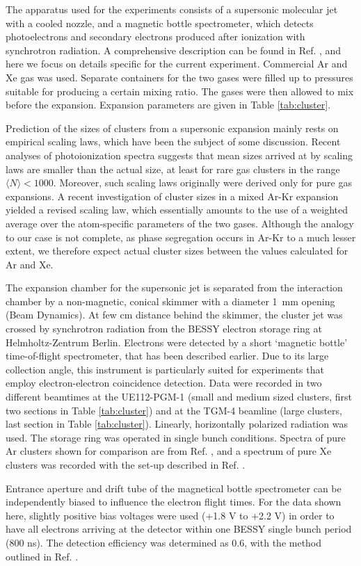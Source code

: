 %
%
The apparatus used for the experiments consists of a supersonic molecular jet with a cooled nozzle, and a magnetic bottle spectrometer, which detects photoelectrons and secondary electrons produced after ionization with synchrotron radiation.\cite{arion} 
A comprehensive description can be found in Ref. \cite{arion}, and here we focus on details specific for the current experiment. Commercial Ar and Xe gas was used. 
Separate containers for the two gases were filled up to pressures suitable for producing a certain mixing ratio. The gases were then allowed to mix before the expansion. 
Expansion parameters are given in Table \ref{tab:cluster}.

Prediction of the sizes of clusters from a supersonic expansion mainly rests on empirical scaling laws,\cite{hagena1981} which have been the subject of some discussion.
Recent analyses of photoionization spectra suggests that mean sizes arrived at by scaling laws are smaller than the actual size, at least for rare gas clusters in the range $\langle N\rangle < 1000$.\cite{bergersen,hergenhahnprb,foerstel_arg2_2011}
Moreover, such scaling laws originally were derived only for pure gas expansions.
A recent investigation of cluster sizes in a mixed Ar-Kr expansion yielded a revised scaling law, which essentially amounts to the use of a weighted average over the atom-specific parameters of the two gases.\cite{danylchenko2015} 
Although the analogy to our case is not complete, as phase segregation occurs in Ar-Kr to a much lesser extent,\cite{Vach_1999,lundwall_arkr} we therefore expect actual cluster sizes between the values calculated for Ar and Xe.

The expansion chamber for the supersonic jet is separated from the interaction chamber by a non-magnetic, conical skimmer with a diameter 1~mm opening (Beam Dynamics). 
At few cm distance behind the skimmer, the cluster jet was crossed by synchrotron radiation from the BESSY electron storage ring at Helmholtz-Zentrum Berlin. 
Electrons were detected by a short `magnetic bottle' time-of-flight spectrometer, that has been described earlier.\cite{mucke_review}
Due to its large collection angle, this instrument is particularly suited for experiments that employ electron-electron coincidence detection.
Data were recorded in two different beamtimes at the UE112-PGM-1 (small and medium sized clusters, first two sections in Table \ref{tab:cluster}) and at the TGM-4 beamline (large clusters, last section in Table \ref{tab:cluster}). 
Linearly, horizontally polarized radiation was used. 
The storage ring was operated in single bunch conditions.
Spectra of pure Ar clusters shown for comparison are from Ref. \cite{foerstel_arg2_2011}, and a spectrum of pure Xe clusters was recorded with the set-up described in Ref. \cite{hergenhahnprb}.

Entrance aperture and drift tube of the magnetical bottle spectrometer can be independently biased to influence the electron flight times. 
For the data shown here, slightly positive bias voltages were used (+1.8 V to +2.2 V) in order to have all electrons arriving at the detector within one BESSY single bunch period (800 ns). 
The detection efficiency was determined as 0.6, with the method outlined in Ref. \cite{mucke_review}.
